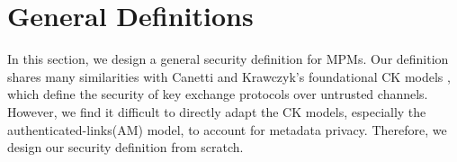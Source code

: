 \section{General Definitions}
\label{sec:general-defn}
In this section, we design a general security definition for MPMs. Our definition shares many similarities with Canetti and Krawczyk's foundational CK models \cite{CK2001keyexchange}, which define the security of key exchange protocols over untrusted channels. However, we find it difficult to directly adapt the CK models, especially the authenticated-links(AM) model, to account for metadata privacy. Therefore, we design our security definition from scratch.

